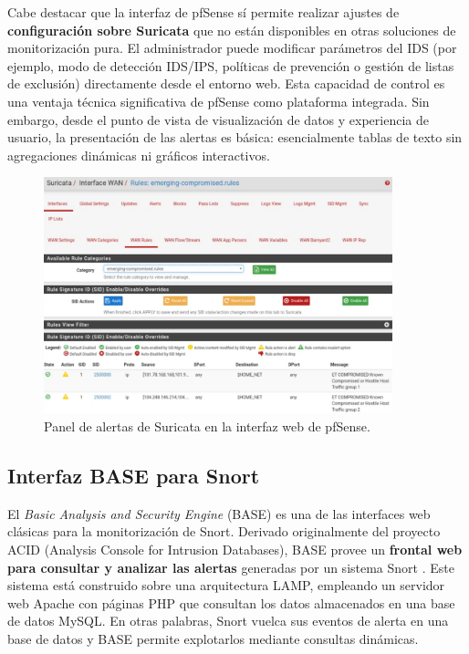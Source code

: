 \documentclass[11pt,a4paper,twoside]{report}
\begin{document}
Cabe destacar que la interfaz de pfSense sí permite realizar ajustes de \textbf{configuración sobre Suricata} que no están disponibles en otras soluciones de monitorización pura. El administrador puede modificar parámetros del IDS (por ejemplo, modo de detección IDS/IPS, políticas de prevención o gestión de listas de exclusión) directamente desde el entorno web. Esta capacidad de control es una ventaja técnica significativa de pfSense como plataforma integrada. Sin embargo, desde el punto de vista de visualización de datos y experiencia de usuario, la presentación de las alertas es básica: esencialmente tablas de texto sin agregaciones dinámicas ni gráficos interactivos.

\begin{figure}[hbtp]
	\centering
	\includegraphics[width=0.9\textwidth]{documento/1.png}
	\caption{Panel de alertas de Suricata en la interfaz web de pfSense.}
	\label{fig:pfsense-alerts}
\end{figure}

\subsection{Interfaz BASE para Snort}
El \emph{Basic Analysis and Security Engine} (BASE) es una de las interfaces web clásicas para la monitorización de Snort. Derivado originalmente del proyecto ACID (Analysis Console for Intrusion Databases), BASE provee un \textbf{frontal web para consultar y analizar las alertas} generadas por un sistema Snort \cite{base}. Este sistema está construido sobre una arquitectura LAMP, empleando un servidor web Apache con páginas PHP que consultan los datos almacenados en una base de datos MySQL. En otras palabras, Snort vuelca sus eventos de alerta en una base de datos y BASE permite explotarlos mediante consultas dinámicas.\newline
\end{document}
